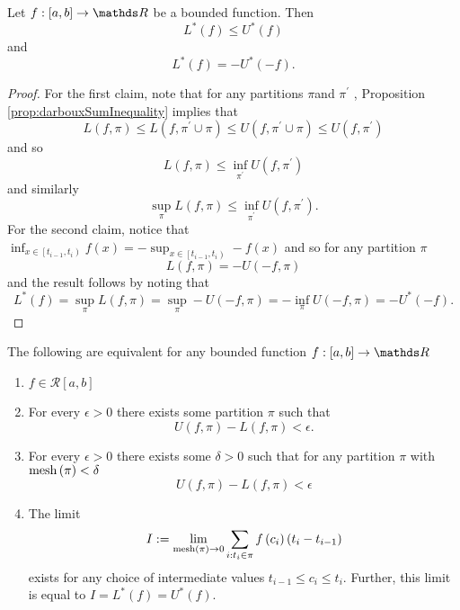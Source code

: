 \begin{prop}
\label{prop:upperAndLowerSumRelation}Let $f:\left[a,b\right]\to\R$
be a bounded function. Then 
\[
L^{*}\left(f\right)\leq U^{*}\left(f\right)
\]
and
\[
L^{*}\left(f\right)=-U^{*}\left(-f\right).
\]
\end{prop}

\begin{proof}
For the first claim, note that for any partitions $\pi$and $\pi^{\prime}$
, Proposition \ref{prop:darbouxSumInequality} implies that
\[
L\left(f,\pi\right)\leq L\left(f,\pi^{\prime}\cup\pi\right)\leq U\left(f,\pi^{\prime}\cup\pi\right)\leq U\left(f,\pi^{\prime}\right)
\]
and so 
\[
L\left(f,\pi\right)\leq\inf_{\pi^{\prime}}U\left(f,\pi^{\prime}\right)
\]
and similarly
\[
\sup_{\pi}L\left(f,\pi\right)\leq\inf_{\pi^{\prime}}U\left(f,\pi^{\prime}\right).
\]
For the second claim, notice that $\inf_{x\in\left[t_{i-1},t_{i}\right)}f\left(x\right)=-\sup_{x\in\left[t_{i-1},t_{i}\right)}-f\left(x\right)$
and so for any partition $\pi$
\[
L\left(f,\pi\right)=-U\left(-f,\pi\right)
\]
and the result follows by noting that 
\[
L^{*}\left(f\right)=\sup_{\pi}L\left(f,\pi\right)=\sup_{\pi}-U\left(-f,\pi\right)=-\inf_{\pi}U\left(-f,\pi\right)=-U^{*}\left(-f\right).
\]
\end{proof}
\begin{thm}
\label{thm:riemannIntegrability}The following are equivalent for
any bounded function $f:\left[a,b\right]\to\R$

\begin{enumerate}[label=(\roman*),leftmargin=.1\linewidth,rightmargin=.4\linewidth]
	\item $ f \in \mathcal{R}\left[a,b\right]$
	\item For every $\epsilon > 0$ there exists some partition $\pi$ such that 
		\[
			U\left(f,\pi\right) - L\left(f,\pi\right) < \epsilon.
		\]
	\item For every $\epsilon >0$ there exists some $\delta > 0$ such that for any partition $\pi$ with $\mathrm{mesh} \left(\pi\right) < \delta$
		\[
			U\left(f,\pi\right) - L\left(f,\pi\right) < \epsilon
		\]
	\item The limit 
	\[
		I := \lim_{\mathrm{mesh}\left(\pi\right) \to 0}\sum_{i: t_i \in \pi } f\left( c_i \right)\left(t_i - t_{i-1}\right)
	\]
	exists for any choice of intermediate values $t_{i-1} \leq c_i \leq t_i $. Further, this limit is equal to $I = L^*(f)=U^*(f)$.
\end{enumerate}
\end{thm}

